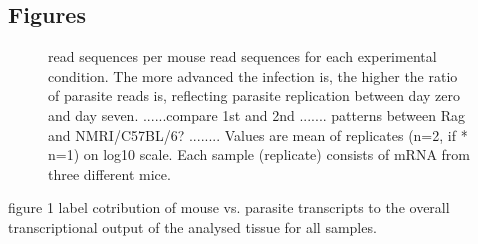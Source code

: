 \documentclass{bmcart}
\begin{document}
\begin{backmatter}


\section*{Figures}

\begin{figure}[h!]
  \caption{
    read sequences per mouse read sequences for each experimental
    condition. The more advanced the infection is, the higher the
    ratio of parasite reads is, reflecting parasite replication
    between day zero and day seven. ......compare 1st and 2nd
    ....... patterns between Rag and NMRI/C57BL/6?  ........ Values
    are mean of replicates (n=2, if * n=1) on log10 scale. Each sample
    (replicate) consists of mRNA from three different mice.}
  \end{figure}

figure 1 label cotribution of mouse vs. parasite transcripts to the
overall transcriptional output of the analysed tissue for all samples.






\end{backmatter}
\end{document}
